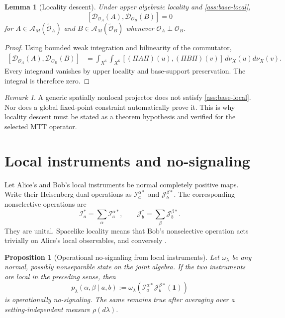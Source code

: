 \documentclass[11pt]{article}
\newcommand{\cA}{\mathcal{A}}
\newcommand{\cI}{\mathcal{I}}
\newcommand{\cJ}{\mathcal{J}}
\newcommand{\cD}{\mathcal{D}}
\newtheorem{proposition}[theorem]{Proposition}
\newtheorem{lemma}[theorem]{Lemma}
\theoremstyle{remark}
\newtheorem{remark}[theorem]{Remark}
\begin{document}
\begin{lemma}[Locality descent]
\label{lem:locality-descent}
Under upper algebraic locality and
\cref{ass:base-local},
\[
 [\cD_{\mathcal O_A}(A),\cD_{\mathcal O_B}(B)]=0
\]
for $A\in\cA_M(\widetilde{\mathcal O}_A)$ and
$B\in\cA_M(\widetilde{\mathcal O}_B)$ whenever
$\mathcal O_A\perp\mathcal O_B$.
\end{lemma}

\begin{proof}
Using bounded weak integration and bilinearity of the commutator,
\[
\begin{split}
 [\cD_{\mathcal O_A}(A),\cD_{\mathcal O_B}(B)]
 &=
 \int_{X^6}\!\!\int_{X^6}
 [(\Pi A\Pi)(u),(\Pi B\Pi)(v)]\,
 d\nu_X(u)d\nu_X(v).
\end{split}
\]
Every integrand vanishes by upper locality and base-support preservation.
The integral is therefore zero.
\end{proof}

\begin{remark}
A generic spatially nonlocal projector does not satisfy
\cref{ass:base-local}.  Nor does a global fixed-point constraint automatically
prove it.  This is why locality descent must be stated as a theorem hypothesis
and verified for the selected MTT operator.
\end{remark}

\section{Local instruments and no-signaling}
\label{sec:instruments}

Let Alice's and Bob's local instruments be normal completely positive maps.
Write their Heisenberg dual operations as
$\cI_{a}^{\alpha\ast}$ and $\cJ_{b}^{\beta\ast}$.  The corresponding
nonselective operations are
\[
 \cI_a^\ast=\sum_\alpha\cI_{a}^{\alpha\ast},
 \qquad
 \cJ_b^\ast=\sum_\beta\cJ_{b}^{\beta\ast}.
\]
They are unital.  Spacelike locality means that Bob's nonselective operation
acts trivially on Alice's local observables, and conversely
\cite{DaviesLewis1970,Haag1992}.

\begin{proposition}[Operational no-signaling from local instruments]
\label{prop:no-signaling}
Let $\omega_\lambda$ be any normal, possibly nonseparable state on the joint
algebra.  If the two instruments are local in the preceding sense, then
\[
 p_\lambda(\alpha,\beta\mid a,b)
 :=
 \omega_\lambda\!\left(
 \cI_{a}^{\alpha\ast}
 \cJ_{b}^{\beta\ast}(\mathbf 1)\right)
\]
is operationally no-signaling.  The same remains true after averaging over a
setting-independent measure $\rho(d\lambda)$.
\end{proposition}
\end{document}
